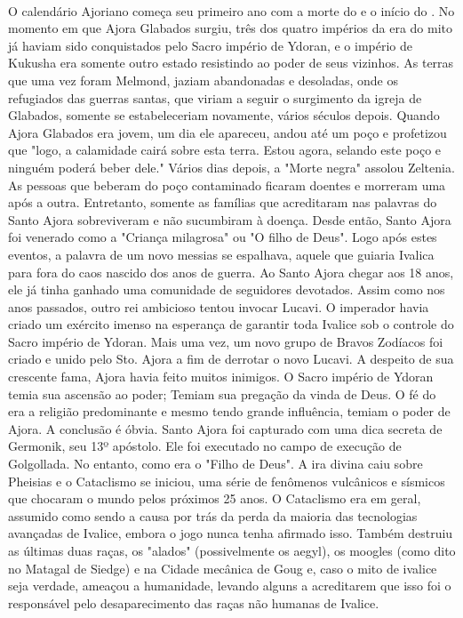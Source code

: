 \ofpar
%
\\
O calendário Ajoriano começa seu primeiro ano com a morte do  e o início do .
No momento em que Ajora Glabados surgiu, três dos quatro impérios da era do mito já haviam sido conquistados pelo Sacro império de Ydoran, e o império de Kukusha era somente outro estado resistindo ao poder de seus vizinhos.
As terras que uma vez foram Melmond, jaziam abandonadas e desoladas, onde os refugiados das guerras santas, que viriam a seguir o surgimento da igreja de Glabados, somente se estabeleceriam novamente, vários séculos depois.
Quando Ajora Glabados era jovem, um dia ele apareceu, andou até um poço e profetizou que "logo, a calamidade cairá sobre esta terra. Estou agora, selando este poço e ninguém poderá beber dele." Vários dias depois, a "Morte negra" assolou Zeltenia.
As pessoas que beberam do poço contaminado ficaram doentes e morreram uma após a outra.
Entretanto, somente as famílias que acreditaram nas palavras do Santo Ajora sobreviveram e não sucumbiram à doença.
Desde então, Santo Ajora foi venerado como a "Criança milagrosa" ou "O filho de Deus".
Logo após estes eventos, a palavra de um novo messias se espalhava, aquele que guiaria Ivalica para fora do caos nascido dos anos de guerra.
Ao Santo Ajora chegar aos 18 anos, ele já tinha ganhado uma comunidade de seguidores devotados.
Assim como nos anos passados, outro rei ambicioso tentou invocar Lucavi.
O imperador havia criado um exército imenso na esperança de garantir toda Ivalice sob o controle do Sacro império de Ydoran.
Mais uma vez, um novo grupo de Bravos Zodíacos foi criado e unido pelo Sto. Ajora a fim de derrotar o novo Lucavi.
A despeito de sua crescente fama, Ajora havia feito muitos inimigos.
O Sacro império de Ydoran temia sua ascensão ao poder; Temiam sua pregação da vinda de Deus.
O fé do  era a religião predominante e mesmo tendo grande influência, temiam o poder de Ajora. A conclusão é óbvia.
Santo Ajora foi capturado com uma dica secreta de Germonik, seu 13º apóstolo.
Ele foi executado no campo de execução de Golgollada.
No entanto, como era o "Filho de Deus".
A ira divina caiu sobre Pheisias e o Cataclismo se iniciou, uma série de fenômenos vulcânicos e sísmicos que chocaram o mundo pelos próximos 25 anos.
O Cataclismo era em geral, assumido como sendo a causa por trás da perda da maioria das tecnologias avançadas de Ivalice, embora o jogo nunca tenha afirmado isso.
Também destruiu as últimas duas raças, os "alados" (possivelmente os aegyl), os moogles (como dito no Matagal de Siedge) e na Cidade mecânica de Goug e, caso o mito de ivalice seja verdade, ameaçou a humanidade, levando alguns a acreditarem que isso foi o responsável pelo desaparecimento das raças não humanas de Ivalice.
